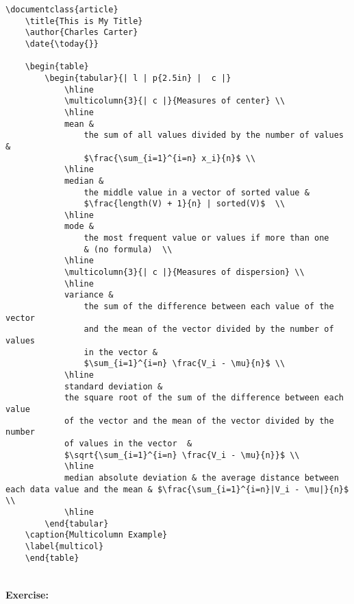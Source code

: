         \begin{verbatim}
\documentclass{article}
    \title{This is My Title}
    \author{Charles Carter}
    \date{\today{}}
 
    \begin{table}
        \begin{tabular}{| l | p{2.5in} |  c |}
            \hline
            \multicolumn{3}{| c |}{Measures of center} \\
            \hline
            mean & 
                the sum of all values divided by the number of values & 
                $\frac{\sum_{i=1}^{i=n} x_i}{n}$ \\
            \hline
            median & 
                the middle value in a vector of sorted value & 
                $\frac{length(V) + 1}{n} | sorted(V)$  \\
            \hline
            mode & 
                the most frequent value or values if more than one  
                & (no formula)  \\
            \hline
            \multicolumn{3}{| c |}{Measures of dispersion} \\
            \hline
            variance & 
                the sum of the difference between each value of the vector 
                and the mean of the vector divided by the number of values 
                in the vector & 
                $\sum_{i=1}^{i=n} \frac{V_i - \mu}{n}$ \\
            \hline
            standard deviation & 
            the square root of the sum of the difference between each value 
            of the vector and the mean of the vector divided by the number 
            of values in the vector  & 
            $\sqrt{\sum_{i=1}^{i=n} \frac{V_i - \mu}{n}}$ \\
            \hline
            median absolute deviation & the average distance between each data value and the mean & $\frac{\sum_{i=1}^{i=n}|V_i - \mu|}{n}$  \\ 
            \hline
        \end{tabular}
    \caption{Multicolumn Example}
    \label{multicol}
    \end{table}
    
        \end{verbatim}

        \paragraph{Exercise:}

